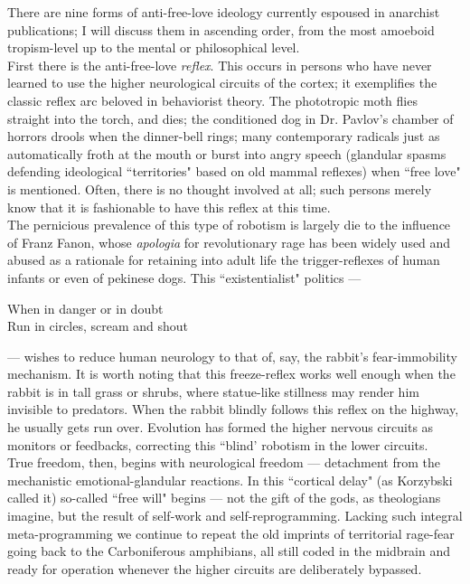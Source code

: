 \documentclass[12pt, onecolumn, letterpaper, oneside]{book}
\begin{document}
There are nine forms of anti-free-love ideology currently espoused in anarchist publications; I will discuss them in ascending order, from the most amoeboid tropism-level up to the mental or philosophical level.\\
First there is the anti-free-love \emph{reflex}. This occurs in persons who have never learned to use the higher neurological circuits of the cortex; it exemplifies the classic reflex arc beloved in behaviorist theory. The phototropic moth flies straight into the torch, and dies; the conditioned dog in Dr. Pavlov's chamber of horrors drools when the dinner-bell rings; many contemporary radicals just as automatically froth at the mouth or burst into angry speech (glandular spasms defending ideological ``territories" based on old mammal reflexes) when ``free love" is mentioned. Often, there is no thought involved at all; such persons merely know that it is fashionable to have this reflex at this time.\\
The pernicious prevalence of this type of robotism is largely die to the influence of Franz Fanon, whose \emph{apologia} for revolutionary rage has been widely used and abused as a rationale for retaining into adult life the trigger-reflexes of human infants or even of pekinese dogs. This ``existentialist" politics ---
\begin{addmargin}{2cm}
When in danger or in doubt\\
Run in circles, scream and shout
\end{addmargin}
--- wishes to reduce human neurology to that of, say, the rabbit's fear-immobility mechanism. It is worth noting that this freeze-reflex works well enough when the rabbit is in tall grass or shrubs, where statue-like stillness may render him invisible to predators. When the rabbit blindly follows this reflex on the highway, he usually gets run over. Evolution has formed the higher nervous circuits as monitors or feedbacks, correcting this ``blind' robotism in the lower circuits.\\
True freedom, then, begins with neurological freedom --- detachment from the mechanistic emotional-glandular reactions. In this ``cortical delay" (as Korzybski called it) so-called ``free will" begins --- not the gift of the gods, as theologians imagine, but the result of self-work and self-reprogramming. Lacking such integral meta-programming we continue to repeat the old imprints of territorial rage-fear going back to the Carboniferous amphibians, all still coded in the midbrain and ready for operation whenever the higher circuits are deliberately bypassed.\\
\end{document}

